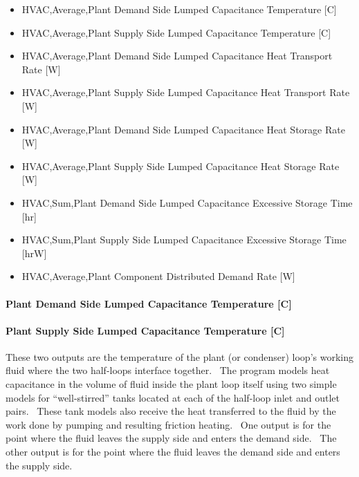 \begin{itemize}
\item
  HVAC,Average,Plant Demand Side Lumped Capacitance Temperature {[}C{]}
\item
  HVAC,Average,Plant Supply Side Lumped Capacitance Temperature {[}C{]}


\item
  HVAC,Average,Plant Demand Side Lumped Capacitance Heat Transport Rate {[}W{]}
\item
  HVAC,Average,Plant Supply Side Lumped Capacitance Heat Transport Rate {[}W{]}
\item
  HVAC,Average,Plant Demand Side Lumped Capacitance Heat Storage Rate {[}W{]}
\item
  HVAC,Average,Plant Supply Side Lumped Capacitance Heat Storage Rate {[}W{]}
\item
  HVAC,Sum,Plant Demand Side Lumped Capacitance Excessive Storage Time {[}hr{]}
\item
  HVAC,Sum,Plant Supply Side Lumped Capacitance Excessive Storage Time {[}hrW{]}

  
\item
  HVAC,Average,Plant Component Distributed Demand Rate {[}W{]}
\end{itemize}

\paragraph{Plant Demand Side Lumped Capacitance Temperature {[}C{]}}\label{plant-demand-side-lumped-capacitance-temperature-c}

\paragraph{Plant Supply Side Lumped Capacitance Temperature {[}C{]}}\label{plant-supply-side-lumped-capacitance-temperature-c}

These two outputs are the temperature of the plant (or condenser) loop's working fluid where the two half-loops interface together.~ The program models heat capacitance in the volume of fluid inside the plant loop itself using two simple models for ``well-stirred'' tanks located at each of the half-loop inlet and outlet pairs.~ These tank models also receive the heat transferred to the fluid by the work done by pumping and resulting friction heating.~ One output is for the point where the fluid leaves the supply side and enters the demand side.~ The other output is for the point where the fluid leaves the demand side and enters the supply side.

